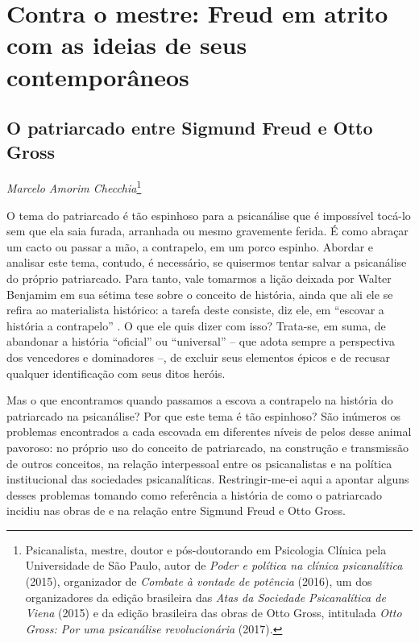 \part{Contra o mestre: Freud em atrito com as ideias de seus contemporâneos}


\chapter*{O patriarcado entre Sigmund Freud e Otto Gross}

\begin{flushright}
\emph{Marcelo Amorim Checchia}\footnote{Psicanalista, mestre, doutor e
  pós-doutorando em Psicologia Clínica pela Universidade de São Paulo,
  autor de \emph{Poder e política na clínica psicanalítica} (2015),
  organizador de \emph{Combate à vontade de potência} (2016), um dos
  organizadores da edição brasileira das \emph{Atas da Sociedade
  Psicanalítica de Viena} (2015) e da edição brasileira das obras de
  Otto Gross, intitulada \emph{Otto Gross: Por uma psicanálise
  revolucionária} (2017).}
\end{flushright}

O tema do patriarcado é tão espinhoso para a psicanálise que é
impossível tocá-lo sem que ela saia furada, arranhada ou mesmo
gravemente ferida. É como abraçar um cacto ou passar a mão, a
contrapelo, em um porco espinho. Abordar e analisar este tema, contudo,
é necessário, se quisermos tentar salvar a psicanálise do próprio
patriarcado. Para tanto, vale tomarmos a lição deixada por Walter
Benjamim em sua sétima tese sobre o conceito de história, ainda que ali
ele se refira ao materialista histórico: a tarefa deste consiste, diz
ele, em ``escovar a história a contrapelo'' . O que ele quis dizer com
isso? Trata-se, em suma, de abandonar a história ``oficial'' ou
``universal'' -- que adota sempre a perspectiva dos vencedores e
dominadores --, de excluir seus elementos épicos e de recusar qualquer
identificação com seus ditos heróis.

Mas o que encontramos quando passamos a escova a contrapelo na história
do patriarcado na psicanálise? Por que este tema é tão espinhoso? São
inúmeros os problemas encontrados a cada escovada em diferentes níveis
de pelos desse animal pavoroso: no próprio uso do conceito de
patriarcado, na construção e transmissão de outros conceitos, na relação
interpessoal entre os psicanalistas e na política institucional das
sociedades psicanalíticas. Restringir-me-ei aqui a apontar alguns desses
problemas tomando como referência a história de como o patriarcado
incidiu nas obras de e na relação entre Sigmund Freud e Otto Gross.

